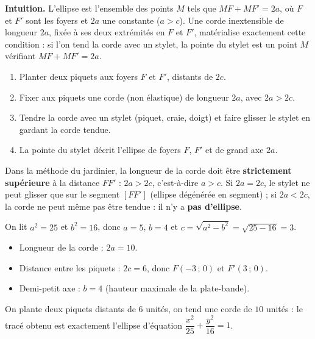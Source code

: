 \documentclass[11pt]{article}
\newcommand{\cle}[1]{{\popxbold\color{popdark}#1}}
\begin{document}
\textbf{Intuition.} L'ellipse est l'ensemble des points $M$ tels que $MF + MF' = 2a$, où $F$ et $F'$ sont les foyers et $2a$ une constante ($a > c$). Une corde inextensible de longueur $2a$, fixée à ses deux extrémités en $F$ et $F'$, matérialise exactement cette condition : si l'on tend la corde avec un stylet, la pointe du stylet est un point $M$ vérifiant $MF + MF' = 2a$.

\begin{methode}
\begin{enumerate}
\item Planter deux piquets aux foyers $F$ et $F'$, distants de $2c$.
\item Fixer aux piquets une corde (non élastique) de longueur $2a$, avec $2a > 2c$.
\item Tendre la corde avec un stylet (piquet, craie, doigt) et faire glisser le stylet en gardant la corde tendue.
\item La pointe du stylet décrit l'\cle{ellipse} de foyers $F$, $F'$ et de grand axe $2a$.
\end{enumerate}
\end{methode}

\begin{attention}
Dans la méthode du jardinier, la longueur de la corde doit être \textbf{strictement supérieure} à la distance $FF'$ : $2a > 2c$, c'est-à-dire $a > c$. Si $2a = 2c$, le stylet ne peut glisser que sur le segment $[FF']$ (ellipse dégénérée en segment) ; si $2a < 2c$, la corde ne peut même pas être tendue : il n'y a \textbf{pas d'ellipse}.
\end{attention}

\begin{exemplebox}[Exemple chiffré : ellipse d'équation $\dfrac{x^2}{25} + \dfrac{y^2}{16} = 1$]
On lit $a^2 = 25$ et $b^2 = 16$, donc $a = 5$, $b = 4$ et $c = \sqrt{a^2 - b^2} = \sqrt{25-16} = 3$.
\begin{itemize}
\item Longueur de la corde : $2a = 10$.
\item Distance entre les piquets : $2c = 6$, donc $F(-3\,;\,0)$ et $F'(3\,;\,0)$.
\item Demi-petit axe : $b = 4$ (hauteur maximale de la plate-bande).
\end{itemize}
On plante deux piquets distants de $6$ unités, on tend une corde de $10$ unités : le tracé obtenu est exactement l'ellipse d'équation $\dfrac{x^2}{25} + \dfrac{y^2}{16} = 1$.
\end{exemplebox}
\end{document}
